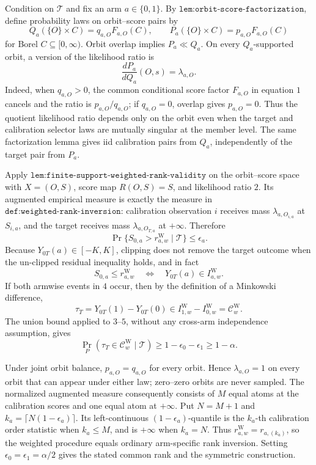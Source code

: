 Condition on \(\mathcal T\) and fix an arm \(a\in\{0,1\}\). By \(\texttt{lem:orbit-score-factorization}\), define probability laws on orbit--score pairs by
\[
Q_a(\{O\}\times C)=q_{a,O}F_{a,O}(C),\qquad
P_a(\{O\}\times C)=p_{a,O}F_{a,O}(C)\tag{1}
\]
for Borel \(C\subseteq[0,\infty)\). Orbit overlap implies \(P_a\ll Q_a\). On every \(Q_a\)-supported orbit, a version of the likelihood ratio is
\[
\frac{dP_a}{dQ_a}(O,s)=\lambda_{a,O}.\tag{2}
\]
Indeed, when \(q_{a,O}>0\), the common conditional score factor \(F_{a,O}\) in equation \(1\) cancels and the ratio is \(p_{a,O}/q_{a,O}\); if \(q_{a,O}=0\), overlap gives \(p_{a,O}=0\). Thus the quotient likelihood ratio depends only on the orbit even when the target and calibration selector laws are mutually singular at the member level. The same factorization lemma gives iid calibration pairs from \(Q_a\), independently of the target pair from \(P_a\).

Apply \(\texttt{lem:finite-support-weighted-rank-validity}\) on the orbit--score space with \(X=(O,S)\), score map \(R(O,S)=S\), and likelihood ratio \(2\). Its augmented empirical measure is exactly the measure in \(\texttt{def:weighted-rank-inversion}\): calibration observation \(i\) receives mass \(\lambda_{a,O_{i,a}}\) at \(S_{i,a}\), and the target receives mass \(\lambda_{a,O_{T,a}}\) at \(+\infty\). Therefore
\[
\Pr\{S_{0,a}>r^{\mathrm W}_{a,w}\mid\mathcal T\}\le\epsilon_a.\tag{3}
\]
Because \(Y_{0T}(a)\in[-K,K]\), clipping does not remove the target outcome when the un-clipped residual inequality holds, and in fact
\[
S_{0,a}\le r^{\mathrm W}_{a,w}\quad\Longleftrightarrow\quad Y_{0T}(a)\in I^{\mathrm W}_{a,w}.\tag{4}
\]
If both armwise events in \(4\) occur, then by the definition of a Minkowski difference,
\[
\tau_T=Y_{0T}(1)-Y_{0T}(0)\in I^{\mathrm W}_{1,w}-I^{\mathrm W}_{0,w}=\mathcal C^{\mathrm W}_w.\tag{5}
\]
The union bound applied to \(3\)--\(5\), without any cross-arm independence assumption, gives
\[
\Pr_P(\tau_T\in\mathcal C^{\mathrm W}_w\mid\mathcal T)\ge1-\epsilon_0-\epsilon_1\ge1-\alpha.\tag{6}
\]

Under joint orbit balance, \(p_{a,O}=q_{a,O}\) for every orbit. Hence \(\lambda_{a,O}=1\) on every orbit that can appear under either law; zero--zero orbits are never sampled. The normalized augmented measure consequently consists of \(M\) equal atoms at the calibration scores and one equal atom at \(+\infty\). Put \(N=M+1\) and \(k_a=\lceil N(1-\epsilon_a)\rceil\). Its left-continuous \((1-\epsilon_a)\)-quantile is the \(k_a\)-th calibration order statistic when \(k_a\le M\), and is \(+\infty\) when \(k_a=N\). Thus \(r^{\mathrm W}_{a,w}=r_{a,(k_a)}\), so the weighted procedure equals ordinary arm-specific rank inversion. Setting \(\epsilon_0=\epsilon_1=\alpha/2\) gives the stated common rank and the symmetric construction.

